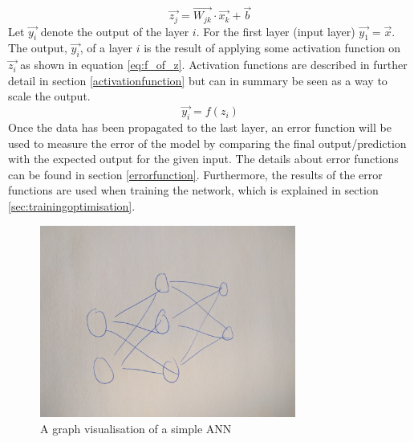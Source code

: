 \begin{equation}\label{eq:z}
    \vec{z_j} = \vec{W_{jk}} \cdot \vec{x_k} + \vec{b}
\end{equation}
Let $\vec{y_i}$ denote the output of the layer $i$. For the first layer (input layer) $\vec{y_1}=\vec{x}$. The output, $\vec{y_i}$, of a layer $i$ is the result of applying some activation function on $\vec{z_i}$ as shown in equation \ref{eq:f_of_z}. Activation functions are described in further detail in section \ref{activationfunction} but can in summary be seen as a way to scale the output.
\begin{equation}\label{eq:f_of_z}
    \vec{y_i} = f(z_i)
\end{equation}
Once the data has been propagated to the last layer, an error function will be used to measure the error of the model by comparing the final output/prediction with the expected output for the given input. The details about error functions can be found in section \ref{errorfunction}. Furthermore, the results of the error functions are used when training the network, which is explained in section \ref{sec:trainingoptimisation}. 

\begin{figure}[h]
    \centering
    \includegraphics[width=0.75\textwidth]{figure/ann/ann}
    \caption{A graph visualisation of a simple ANN}
    \label{fig:simple_ann}
\end{figure}

